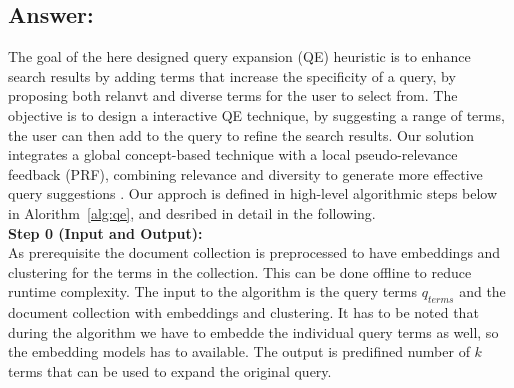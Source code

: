 

\subsection*{Answer:}

The goal of the here designed query expansion (QE) heuristic is to enhance search results by adding terms that increase the specificity of a query, by proposing both relanvt and diverse terms for the user to select from. The objective is to design a interactive QE technique, by suggesting a range of terms, the user can then add to the query to refine the search results.
Our solution integrates a global concept-based technique with a local pseudo-relevance feedback (PRF), combining relevance and diversity to generate more effective query suggestions \cite{azad2019query}. Our approch is defined in high-level algorithmic steps below in Alorithm~\ref{alg:qe}, and desribed in detail in the following.\\

\textbf{Step 0 (Input and Output):}\\
As prerequisite the document collection is preprocessed to have embeddings and clustering for the terms in the collection. This can be done offline to reduce runtime complexity.
The input to the algorithm is the query terms $q_{terms}$ and the document collection with embeddings and clustering. It has to be noted that during the algorithm we have to embedde the individual query terms as well, so the embedding models has to available.
The output is predifined number of $k$ terms that can be used to expand the original query.\\


